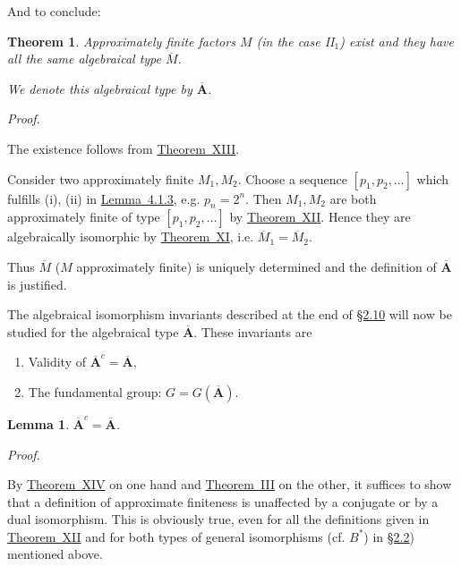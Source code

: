 \documentclass[b5paper,twoside]{article}
\newcommand{\secref}[2]{\hyperref[#1]{\mbox{\S#2}}}
\newcommand{\thmref}[2]{\hyperref[#1]{\mbox{Theorem~#2}}}
\newcommand{\lemref}[2]{\hyperref[#1]{\mbox{Lemma~#2}}}
\theoremstyle{mvnplain}
\newtheorem{theorem}{Theorem}
\newtheorem{lemma}{Lemma}[section]
\renewenvironment{proof}[1][Proof]{%
  \par\addvspace{0.35\baselineskip}%
  \noindent\textit{#1.}\ \normalfont\ignorespaces
}{%
  \par\addvspace{0.35\baselineskip}%
}
\newcommand{\M}{\mathbf M}
\def\M{M}%
\def\mathfrak#1{#1}%
\begin{document}
And to conclude:

\begin{theorem}\label{thm:XIV}
Approximately finite factors \(\M\) (in the case II\(_1\)) exist and they
have all the same algebraical type \(\overline{\M}\).

We denote this algebraical type by \(\overline{\mathbf A}\).
\end{theorem}

\begin{proof}
The existence follows from \thmref{thm:XIII}{XIII}.

Consider two approximately finite \(\M_1,\M_2\). Choose a sequence
\([p_1,p_2,\ldots]\) which fulfills (i), (ii) in
\lemref{lem:4.1.3}{4.1.3}, e.g. \(p_n=2^n\). Then \(\M_1,\M_2\) are both
approximately finite of type \([p_1,p_2,\ldots]\) by
\thmref{thm:XII}{XII}. Hence they are algebraically isomorphic by
\thmref{thm:XI}{XI}, i.e. \(\overline{\M}_1=\overline{\M}_2\).

Thus \(\overline{\M}\) (\(\M\) approximately finite) is uniquely determined
and the definition of \(\overline{\mathbf A}\) is justified.
\end{proof}

The algebraical isomorphism invariants described at the end of
\secref{sec:2.10}{2.10} will now be studied for the algebraical type
\(\overline{\mathbf A}\). These invariants are
\begin{enumerate}[label=(\arabic*)]
\item Validity of \(\overline{\mathbf A}^{c}=\overline{\mathbf A}\),
\item The fundamental group:
\(\mathfrak G=\mathfrak G(\overline{\mathbf A})\).
\end{enumerate}

\begin{lemma}\label{lem:4.8.1}
\(\overline{\mathbf A}^{c}=\overline{\mathbf A}\).
\end{lemma}

\begin{proof}
By \thmref{thm:XIV}{XIV} on one hand and \thmref{thm:III}{III} on the other,
it suffices to show that a definition of approximate finiteness is unaffected
by a conjugate or by a dual isomorphism. This is obviously true, even for all
the definitions given in \thmref{thm:XII}{XII} and for both types of general
isomorphisms (cf. \(B^*\)) in \secref{sec:2.2}{2.2}) mentioned above.
\end{proof}
\end{document}
